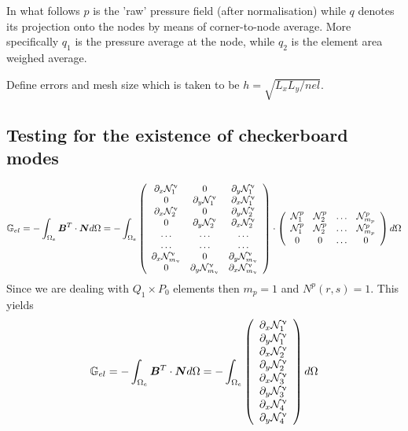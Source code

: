 In what follows $p$ is the 'raw' pressure field (after normalisation)
while $q$ denotes its projection onto the nodes by means of corner-to-node average.
More specifically $q_1$ is the pressure average at the node, 
while $q_2$  is the element area weighed average.

Define errors and mesh size which is taken to be $h = \sqrt{L_xL_y/nel}$. 

\newpage
\subsection*{Testing for the existence of checkerboard modes}



\[
{\mathbb{G}}_{el} = -\int_{\Omega_e} {\bm B}^T \cdot {\bm N} d\Omega
= -\int_{\Omega_e}
\left(
\begin{array}{ccc}
\partial_x {\mathcal{N}}_1^\upnu & 0 & \partial_y {\mathcal{N}}_1^\upnu \\
0 & \partial_y {\mathcal{N}}_1^\upnu & \partial_x {\mathcal{N}}_1^\upnu \\
\partial_x {\mathcal{N}}_2^\upnu & 0 & \partial_y {\mathcal{N}}_2^\upnu \\
0 & \partial_y {\mathcal{N}}_2^\upnu & \partial_x {\mathcal{N}}_2^\upnu \\
\dots & \dots & \dots \\
\dots & \dots & \dots \\
\partial_x {\mathcal{N}}_{m_\upnu}^\upnu & 0 & \partial_y {\mathcal{N}}_{m_\upnu}^\upnu \\
0 & \partial_y {\mathcal{N}}_{m_\upnu}^\upnu & \partial_x {\mathcal{N}}_{m_\upnu}^\upnu 
\end{array}
\right)
\cdot
\left(
\begin{array}{cccc}
{\mathcal{N}}_1^p & {\mathcal{N}}_2^p & \dots & {\mathcal{N}}_{m_p}^p \\ 
{\mathcal{N}}_1^p & {\mathcal{N}}_2^p & \dots & {\mathcal{N}}_{m_p}^p \\ 
0 & 0 & \dots & 0
\end{array}
\right)
d\Omega
\]
Since we are dealing with $Q_1\times P_0$ elements then $m_p=1$ and $N^p(r,s)=1$.
This yields
\[
{\mathbb{G}}_{el} = -\int_{\Omega_e} {\bm B}^T \cdot {\bm N} d\Omega
= -\int_{\Omega_e}
\left(
\begin{array}{ccc}
\partial_x {\mathcal{N}}_1^\upnu \\
\partial_y {\mathcal{N}}_1^\upnu \\
\partial_x {\mathcal{N}}_2^\upnu \\
\partial_y {\mathcal{N}}_2^\upnu \\
\partial_x {\mathcal{N}}_3^\upnu \\
\partial_y {\mathcal{N}}_3^\upnu \\
\partial_x {\mathcal{N}}_4^\upnu \\
\partial_y {\mathcal{N}}_4^\upnu 
\end{array}
\right)
d\Omega
\]

